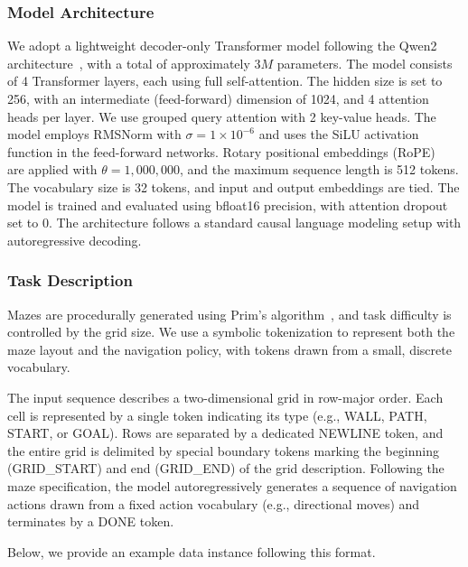 \documentclass[10pt]{article} %
\begin{document}
\subsubsection{Model Architecture}

We adopt a lightweight decoder-only Transformer model following the Qwen2 architecture~\citep{yang2024qwen2technicalreport}, with a total of approximately $3M$ parameters. The model consists of 4 Transformer layers, each using full self-attention. The hidden size is set to 256, with an intermediate (feed-forward) dimension of 1024, and 4 attention heads per layer. We use grouped query attention with 2 key-value heads. The model employs RMSNorm with $\sigma = 1\times10^{-6}$ and uses the SiLU activation function in the feed-forward networks. Rotary positional embeddings (RoPE)~\citep{su2023roformerenhancedtransformerrotary} are applied with $\theta = 1,000,000$, and the maximum sequence length is 512 tokens. The vocabulary size is 32 tokens, and input and output embeddings are tied. The model is trained and evaluated using bfloat16 precision, with attention dropout set to 0. The architecture follows a standard causal language modeling setup with autoregressive decoding.

\subsubsection{Task Description}

Mazes are procedurally generated using Prim’s algorithm~\citep{prim1957shortest}, and task difficulty is controlled by the grid size.
We use a symbolic tokenization to represent both the maze layout and the navigation policy, with tokens drawn from a small, discrete vocabulary.

The input sequence describes a two-dimensional grid in row-major order. Each cell is represented by a single token indicating its type (e.g., \textsc{WALL}, \textsc{PATH}, \textsc{START}, or \textsc{GOAL}). Rows are separated by a dedicated \textsc{NEWLINE} token, and the entire grid is delimited by special boundary tokens marking the beginning (\textsc{GRID\_START}) and end (\textsc{GRID\_END}) of the grid description. Following the maze specification, the model autoregressively generates a sequence of navigation actions drawn from a fixed action vocabulary (e.g., directional moves) and terminates by a \textsc{DONE} token. 

Below, we provide an example data instance following this format.
\end{document}
